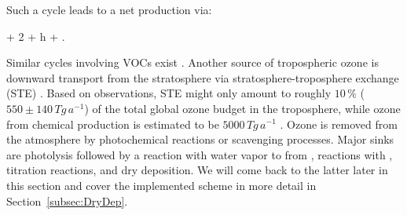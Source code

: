 \documentclass[gmd, manuscript]{copernicus}
\begin{document}
Such a cycle leads to a net production via:
\begin{reaction}
   + 2 + h\nu \rightarrow {} + .
\end{reaction}
Similar cycles involving VOCs exist \citep{ACP:Monks2015}. Another source of tropospheric ozone is downward transport from the stratosphere via stratosphere-troposphere exchange (STE) \citep{WMO2014}. Based on observations, STE might only amount to roughly $10\,\unit{\%}$ ($550 \pm 140\,\unit{Tg\,a^{-1}}$) of the total global ozone budget in the troposphere, while ozone from chemical production is estimated to be $5000\,\unit{Tg\,a^{-1}}$ \citep{ACP:Monks2015}. Ozone is removed from the atmosphere by photochemical reactions or scavenging processes. Major sinks are photolysis followed by a reaction with water vapor to from ,
reactions with , titration reactions, and dry deposition. We will come back to the latter later in this section and cover the implemented scheme in more detail in Section~\ref{subsec:DryDep}.
\end{document}
